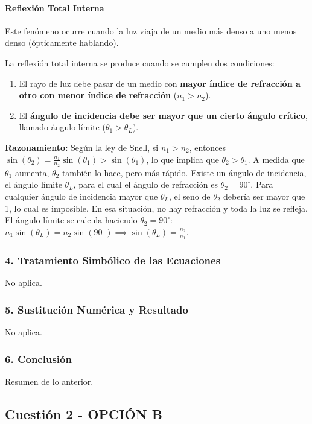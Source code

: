 \paragraph*{Reflexión Total Interna}
Este fenómeno ocurre cuando la luz viaja de un medio más denso a uno menos denso (ópticamente hablando).
\begin{cajaconclusion}
La reflexión total interna se produce cuando se cumplen dos condiciones:
\begin{enumerate}
    \item El rayo de luz debe pasar de un medio con \textbf{mayor índice de refracción a otro con menor índice de refracción} ($n_1 > n_2$).
    \item El \textbf{ángulo de incidencia debe ser mayor que un cierto ángulo crítico}, llamado ángulo límite ($\theta_1 > \theta_L$).
\end{enumerate}
\end{cajaconclusion}
\textbf{Razonamiento:} Según la ley de Snell, si $n_1 > n_2$, entonces $\sin(\theta_2) = \frac{n_1}{n_2}\sin(\theta_1) > \sin(\theta_1)$, lo que implica que $\theta_2 > \theta_1$. A medida que $\theta_1$ aumenta, $\theta_2$ también lo hace, pero más rápido. Existe un ángulo de incidencia, el ángulo límite $\theta_L$, para el cual el ángulo de refracción es $\theta_2 = 90^\circ$. Para cualquier ángulo de incidencia mayor que $\theta_L$, el seno de $\theta_2$ debería ser mayor que 1, lo cual es imposible. En esa situación, no hay refracción y toda la luz se refleja. El ángulo límite se calcula haciendo $\theta_2=90^\circ$: $n_1 \sin(\theta_L) = n_2 \sin(90^\circ) \implies \sin(\theta_L) = \frac{n_2}{n_1}$.

\subsubsection*{4. Tratamiento Simbólico de las Ecuaciones}
No aplica.
\subsubsection*{5. Sustitución Numérica y Resultado}
No aplica.
\subsubsection*{6. Conclusión}
Resumen de lo anterior.

\newpage

\subsection{Cuestión 2 - OPCIÓN B}
\label{subsec:3B_2005_jun_cv}

